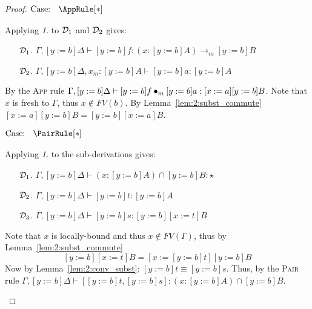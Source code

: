 \begin{proof}
    $\text{Case: }\begin{array}{c} \AppRule[*] \end{array}$
    \begin{proofcase}
        Applying \textit{1.} to $\mathcal{D}_{1}$ and $\mathcal{D}_{2}$ gives:
        \begin{enumerate}
            \item[$\mathcal{D}_{1}$.] $\Gamma, [y := b]\Delta \vdash [y := b]f : (x : [y := b]A) \to_m [y := b]B$
            \item[$\mathcal{D}_{2}$.] $\Gamma, [y := b]\Delta, x_m : [y := b]A \vdash [y := b]a : [y := b]A$
        \end{enumerate}
        By the \textsc{App} rule $\Gamma, [y := b]\Delta \vdash [y := b]f \bullet_{m} [y := b]a : [x := a][y := b]B$.
        Note that $x$ is fresh to $\Gamma$, thus $x \notin FV(b)$.
        By Lemma~\ref{lem:2:subst_commute} $[x := a][y := b]B = [y := b][x := a]B$.
    \end{proofcase}

    $\text{Case: }\begin{array}{c} \PairRule[*] \end{array}$
    \begin{proofcase}
        Applying \textit{1.} to the sub-derivations gives:
        \begin{enumerate}
            \item[$\mathcal{D}_{1}$.] $\Gamma, [y := b]\Delta \vdash (x : [y := b]A) \cap [y := b]B : \star$
            \item[$\mathcal{D}_{2}$.] $\Gamma, [y := b]\Delta \vdash [y := b]t : [y := b]A$
            \item[$\mathcal{D}_{3}$.] $\Gamma, [y := b]\Delta \vdash [y := b]s : [y := b][x := t]B$
        \end{enumerate}
        Note that $x$ is locally-bound and thus $x \notin FV(\Gamma)$, thus by Lemma~\ref{lem:2:subst_commute} $$[y := b][x := t]B = [x := [y := b]t][y := b]B$$
        Now by Lemma~\ref{lem:2:conv_subst}: $[y := b]t \equiv [y := b]s$.
        Thus, by the \textsc{Pair} rule $\Gamma, [y := b]\Delta \vdash [[y := b]t, [y := b]s] : (x : [y := b]A) \cap [y := b]B$.
    \end{proofcase}
\end{proof}

